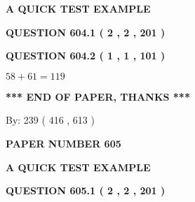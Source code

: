 \documentclass[12pt]{article}
\begin{document}
   
   
   
   
   
 \vspace{0.2in}
{\LARGE {\textbf{ A QUICK TEST EXAMPLE}}}
   
   
  
\vspace{0.2in}
  
{\textbf{\Large{QUESTION
604.1 
 ( 2 , 2 , 201 )
}}}
  
  
  
\vspace{0.2in}
  
{\textbf{\Large{QUESTION
604.2 
 ( 1 , 1 , 101 )
}}}
  
  
 
 

$ %
58 +  %
61=   %
119$
 
 
   
   
 \vspace{0.2in}
 
   
   
   
   
\vspace{1.0in} 
{\textbf{\large{ *** END OF PAPER, THANKS *** }}} 
   
   
\hspace{1.0in} By: 
 239 ( 416 ,  613 )
   
   
   
   
\newpage 
\setcounter{page}{ 
   605001 } 
   
   
   
   
 {\textbf{ \Large{ PAPER NUMBER  605  }}}
   
   
\vspace{0.2in}
   
   
   
   
   
   
 \vspace{0.2in}
{\LARGE {\textbf{ A QUICK TEST EXAMPLE}}}
   
   
  
\vspace{0.2in}
  
{\textbf{\Large{QUESTION
605.1 
 ( 2 , 2 , 201 )
}}}
  
  
  
\vspace{0.2in}
  
\end{document}
